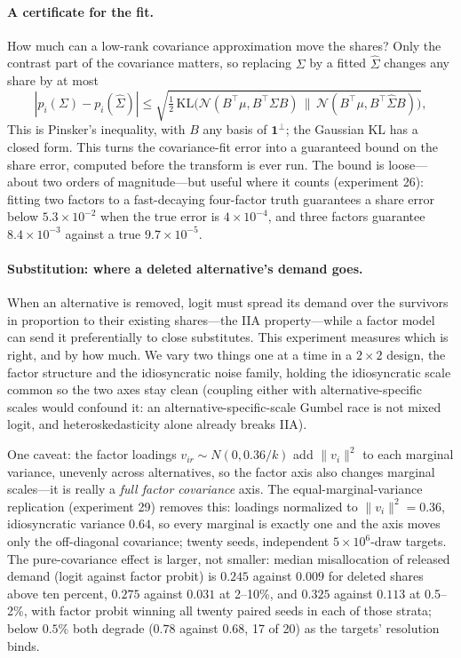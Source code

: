 \documentclass[12pt]{article}
\theoremstyle{remark}
\begin{document}
\paragraph{A certificate for the fit.} How much can a low-rank
covariance approximation move the shares? Only the contrast part of the
covariance matters, so replacing $\Sigma$ by a fitted $\hat\Sigma$
changes any share by at most
\[
|p_i(\Sigma) - p_i(\hat\Sigma)| \le
\sqrt{\tfrac12\,\mathrm{KL}\big(\mathcal{N}(B^\top\mu, B^\top\Sigma B)\,\|\,
\mathcal{N}(B^\top\mu, B^\top\hat\Sigma B)\big)},
\]
This is Pinsker's inequality, with $B$ any basis of $\mathbf{1}^\perp$;
the Gaussian KL has a closed form. This turns the covariance-fit error into a
guaranteed bound on the share error, computed before the transform is
ever run. The bound is loose---about two orders of magnitude---but
useful where it counts (experiment 26): fitting two factors to a
fast-decaying four-factor truth guarantees a share error below
$5.3\times10^{-2}$ when the true error is $4\times10^{-4}$, and three
factors guarantee $8.4\times10^{-3}$ against a true $9.7\times10^{-5}$.

\paragraph{Substitution: where a deleted alternative's demand goes.}
When an alternative is removed, logit must spread its demand over the
survivors in proportion to their existing shares---the IIA property---while
a factor model can send it preferentially to close substitutes. This
experiment measures which is right, and by how much. We vary two things
one at a time in a $2\times2$ design, the factor structure and the
idiosyncratic noise family, holding the idiosyncratic scale common so
the two axes stay clean (coupling either with alternative-specific
scales would confound it: an alternative-specific-scale Gumbel race is
not mixed logit, and heteroskedasticity alone already breaks IIA).

One caveat: the factor loadings $v_{ir} \sim N(0, 0.36/k)$
add $\|v_i\|^2$ to each marginal variance, unevenly across
alternatives, so the factor axis also changes marginal scales---it is
really a \emph{full factor covariance} axis.
The equal-marginal-variance replication (experiment 29) removes this:
loadings normalized to $\|v_i\|^2 = 0.36$, idiosyncratic variance
$0.64$, so every marginal is exactly one and the axis moves only the
off-diagonal covariance; twenty seeds, independent $5\times10^6$-draw
targets. The pure-covariance effect is larger, not smaller: median
misallocation of released demand (logit against factor probit) is
$0.245$ against $0.009$ for deleted shares above ten percent,
$0.275$ against $0.031$ at 2--10\%, and $0.325$ against $0.113$ at
0.5--2\%, with factor probit winning all twenty paired seeds in each of
those strata; below $0.5\%$ both degrade ($0.78$ against $0.68$, 17 of
20) as the targets' resolution binds.
\end{document}
